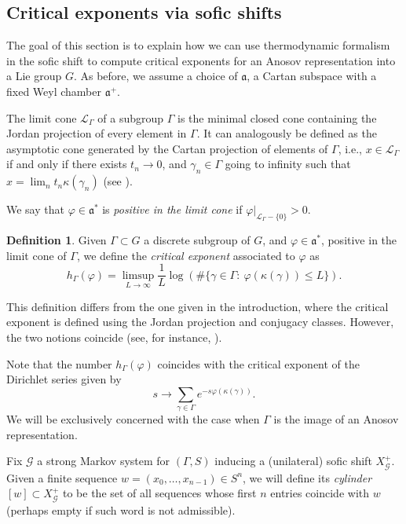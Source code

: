 \documentclass{amsart}
\theoremstyle{remark}
\theoremstyle{definition}
\newtheorem{defi}[thm]{Definition}
\begin{document}
\subsection{Critical exponents via sofic shifts}

The goal of this section is to explain how we can use thermodynamic formalism in the sofic shift to compute critical exponents for an Anosov representation into a Lie group $G$. 
As before, we assume a choice of $\mathfrak{a}$, a Cartan subspace with a fixed Weyl chamber $\mathfrak{a}^+$. 

The limit cone $\mathcal{L}_\Gamma$ of a subgroup $\Gamma$ is the minimal closed cone containing the Jordan projection of every element in $\Gamma$.
It can analogously be defined as the asymptotic cone generated by the Cartan projection of elements of $\Gamma$, i.e.,
$x \in \mathcal{L}_\Gamma$ if and only if there exists $t_n \to 0$, and $\gamma_n \in \Gamma$ going to infinity such that $x = \lim_n t_n \kappa (\gamma_n)$ (see \cite[Remark 6.3]{benoist2016random}).

We say that $\varphi \in \mathfrak{a}^*$ is \emph{positive in the limit cone} if $\varphi|_{\mathcal{L}_\Gamma - \{0\}} > 0$.

\begin{defi}
 Given $\Gamma \subset G$ a discrete subgroup of $G$, and $\varphi \in \mathfrak{a}^*$, positive in the limit cone of $\Gamma$, we define the \emph{critical exponent} associated to $\varphi$ as
 $$
 h_\Gamma (\varphi)
 =\limsup_{L\to\infty}\frac{1}{L}\log\left(\#\{\gamma\in\Gamma:\ \varphi(\kappa(\gamma))\le L\}\right).
    $$
\end{defi}
This definition differs from the one given in the introduction, where the critical exponent is defined using the Jordan projection and conjugacy classes. However, the two notions coincide (see, for instance, \cite{glorieux2023hausdorff}).

Note that the number $h_\Gamma (\varphi)$ coincides with the critical exponent of the Dirichlet series given by
\[
s \to \sum_{\gamma \in \Gamma} e^{-s\varphi(\kappa(\gamma))}.
\]
We will be exclusively concerned with the case when $\Gamma$ is the image of an Anosov representation. 

Fix $\mathcal{G}$ a strong Markov system for $(\Gamma,S)$ inducing a (unilateral) sofic shift $X_{\mathcal{G}}^+$.
Given a finite sequence $w = (x_0,\ldots,x_{n-1}) \in S^{n}$, we will define its \emph{cylinder} $[w] \subset X_\mathcal{G}^+$ to be the set of all sequences whose first $n$ entries coincide with $w$ (perhaps empty if such word is not admissible).
\end{document}
